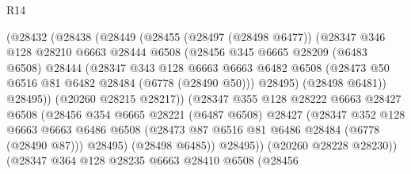 \begin{lexlean}{R14}
\begin{coremodule}
                        (@28432
                          (@28438
                            (@28449
                              (@28455
                                (@28497 (@28498 @6477))
                                (@28347
                                  @346
                                  @128
                                  @28210
                                  @6663
                                  @28444
                                  @6508
                                  (@28456
                                    @345
                                    @6665
                                    @28209
                                    (@6483 @6508)
                                    @28444
                                    (@28347
                                      @343
                                      @128
                                      @6663
                                      @6663
                                      @6482
                                      @6508
                                      (@28473 @50 @6516 @81 @6482 @28484 (@6778 (@28490 @50)))
                                      @28495)
                                    (@28498 @6481))
                                  @28495))
                              (@20260 @28215 @28217))
                            (@28347
                              @355
                              @128
                              @28222
                              @6663
                              @28427
                              @6508
                              (@28456
                                @354
                                @6665
                                @28221
                                (@6487 @6508)
                                @28427
                                (@28347
                                  @352
                                  @128
                                  @6663
                                  @6663
                                  @6486
                                  @6508
                                  (@28473 @87 @6516 @81 @6486 @28484 (@6778 (@28490 @87)))
                                  @28495)
                                (@28498 @6485))
                              @28495))
                          (@20260 @28228 @28230))
                        (@28347
                          @364
                          @128
                          @28235
                          @6663
                          @28410
                          @6508
                          (@28456

\end{coremodule}
\end{lexlean}
